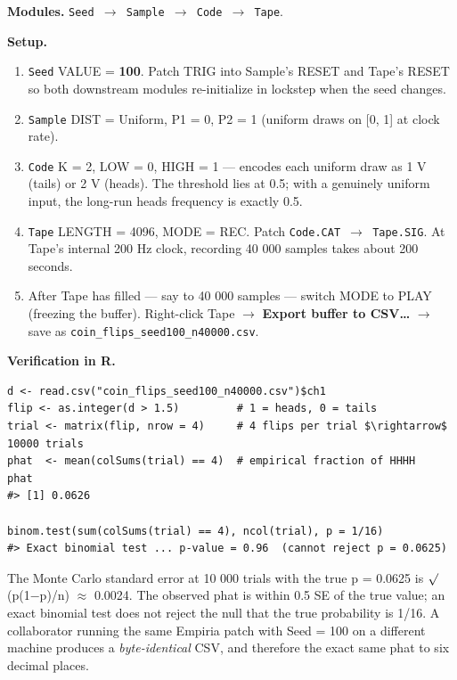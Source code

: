 \textbf{Modules.} \texttt{Seed\ $\rightarrow$\ Sample\ $\rightarrow$\ Code\ $\rightarrow$\ Tape}.

\textbf{Setup.}

\begin{enumerate}
\def\labelenumi{\arabic{enumi}.}
\tightlist
\item
  \texttt{Seed} VALUE = \textbf{100}. Patch TRIG into Sample's RESET and
  Tape's RESET so both downstream modules re-initialize in lockstep when
  the seed changes.
\item
  \texttt{Sample} DIST = Uniform, P1 = 0, P2 = 1 (uniform draws on {[}0,
  1{]} at clock rate).
\item
  \texttt{Code} K = 2, LOW = 0, HIGH = 1 --- encodes each uniform draw
  as 1 V (tails) or 2 V (heads). The threshold lies at 0.5; with a
  genuinely uniform input, the long-run heads frequency is exactly 0.5.
\item
  \texttt{Tape} LENGTH = 4096, MODE = REC. Patch
  \texttt{Code.CAT\ $\rightarrow$\ Tape.SIG}. At Tape's internal 200 Hz clock,
  recording 40 000 samples takes about 200 seconds.
\item
  After Tape has filled --- say to 40 000 samples --- switch MODE to
  PLAY (freezing the buffer). Right-click Tape $\rightarrow$ \textbf{Export buffer
  to CSV\ldots{}} $\rightarrow$ save as \texttt{coin\_flips\_seed100\_n40000.csv}.
\end{enumerate}

\textbf{Verification in R.}

\begin{verbatim}
d <- read.csv("coin_flips_seed100_n40000.csv")$ch1
flip <- as.integer(d > 1.5)         # 1 = heads, 0 = tails
trial <- matrix(flip, nrow = 4)     # 4 flips per trial $\rightarrow$ 10000 trials
phat  <- mean(colSums(trial) == 4)  # empirical fraction of HHHH
phat
#> [1] 0.0626

binom.test(sum(colSums(trial) == 4), ncol(trial), p = 1/16)
#> Exact binomial test ... p-value = 0.96  (cannot reject p = 0.0625)
\end{verbatim}

The Monte Carlo standard error at 10 000 trials with the true p = 0.0625
is \ensuremath{\surd}(p(1$-$p)/n) \ensuremath{\approx} 0.0024. The observed phat is within 0.5 SE of the true
value; an exact binomial test does not reject the null that the true
probability is 1/16. A collaborator running the same Empiria patch with
Seed = 100 on a different machine produces a \emph{byte-identical} CSV,
and therefore the exact same phat to six decimal places.

